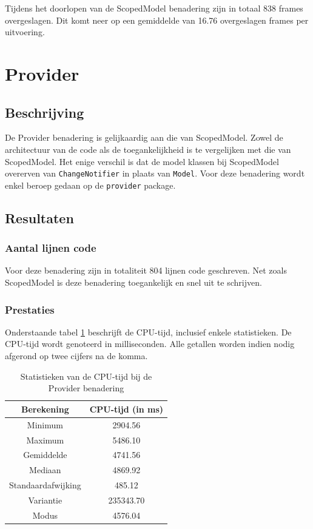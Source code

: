 Tijdens het doorlopen van de ScopedModel benadering zijn in totaal 838 frames overgeslagen. Dit komt neer op een gemiddelde van 16.76 overgeslagen frames per uitvoering.

\section{Provider}
\subsection{Beschrijving}
De Provider benadering is gelijkaardig aan die van ScopedModel. Zowel de architectuur van de code als de toegankelijkheid is te vergelijken met die van ScopedModel. Het enige verschil is dat de model klassen bij ScopedModel overerven van \verb|ChangeNotifier| in plaats van \verb|Model|. \newline \newline
Voor deze benadering wordt enkel beroep gedaan op de \verb|provider| package. 

\subsection{Resultaten}
\subsubsection{Aantal lijnen code}
Voor deze benadering zijn in totaliteit 804 lijnen code geschreven. Net zoals ScopedModel is deze benadering toegankelijk en snel uit te schrijven.

\subsubsection{Prestaties}
Onderstaande tabel \ref{table:experiment-provider-statistics} beschrijft de CPU-tijd, inclusief enkele statistieken. De CPU-tijd wordt genoteerd in milliseconden. Alle getallen worden indien nodig afgerond op twee cijfers na de komma.
\begin{table}[H]
    \centering
    \begin{tabular}{c|c}
        \textbf{Berekening} & \textbf{CPU-tijd (in ms)}  \\ \hline
        Minimum             & 2904.56                    \\ \hline
        Maximum             & 5486.10                    \\ \hline
        Gemiddelde          & 4741.56                    \\ \hline
        Mediaan             & 4869.92                    \\ \hline
        Standaardafwijking  & 485.12                     \\ \hline
        Variantie           & 235343.70                  \\ \hline
        Modus               & 4576.04                      \\                
    \end{tabular}
    \caption{Statistieken van de CPU-tijd bij de Provider benadering}
    \label{table:experiment-provider-statistics}
\end{table}

